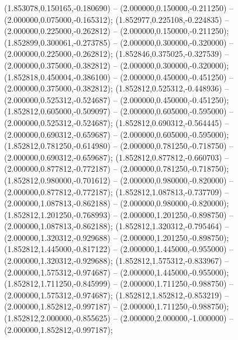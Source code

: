  (1.853078,0.150165,-0.180690) -- (2.000000,0.150000,-0.211250) -- (2.000000,0.075000,-0.165312);
 (1.852977,0.225108,-0.224835) -- (2.000000,0.225000,-0.262812) -- (2.000000,0.150000,-0.211250);
 (1.852899,0.300061,-0.273785) -- (2.000000,0.300000,-0.320000) -- (2.000000,0.225000,-0.262812);
 (1.852846,0.375025,-0.327539) -- (2.000000,0.375000,-0.382812) -- (2.000000,0.300000,-0.320000);
 (1.852818,0.450004,-0.386100) -- (2.000000,0.450000,-0.451250) -- (2.000000,0.375000,-0.382812);
 (1.852812,0.525312,-0.448936) -- (2.000000,0.525312,-0.524687) -- (2.000000,0.450000,-0.451250);
 (1.852812,0.605000,-0.509097) -- (2.000000,0.605000,-0.595000) -- (2.000000,0.525312,-0.524687);
 (1.852812,0.690312,-0.564445) -- (2.000000,0.690312,-0.659687) -- (2.000000,0.605000,-0.595000);
 (1.852812,0.781250,-0.614980) -- (2.000000,0.781250,-0.718750) -- (2.000000,0.690312,-0.659687);
 (1.852812,0.877812,-0.660703) -- (2.000000,0.877812,-0.772187) -- (2.000000,0.781250,-0.718750);
 (1.852812,0.980000,-0.701612) -- (2.000000,0.980000,-0.820000) -- (2.000000,0.877812,-0.772187);
 (1.852812,1.087813,-0.737709) -- (2.000000,1.087813,-0.862188) -- (2.000000,0.980000,-0.820000);
 (1.852812,1.201250,-0.768993) -- (2.000000,1.201250,-0.898750) -- (2.000000,1.087813,-0.862188);
 (1.852812,1.320312,-0.795464) -- (2.000000,1.320312,-0.929688) -- (2.000000,1.201250,-0.898750);
 (1.852812,1.445000,-0.817122) -- (2.000000,1.445000,-0.955000) -- (2.000000,1.320312,-0.929688);
 (1.852812,1.575312,-0.833967) -- (2.000000,1.575312,-0.974687) -- (2.000000,1.445000,-0.955000);
 (1.852812,1.711250,-0.845999) -- (2.000000,1.711250,-0.988750) -- (2.000000,1.575312,-0.974687);
 (1.852812,1.852812,-0.853219) -- (2.000000,1.852812,-0.997187) -- (2.000000,1.711250,-0.988750);
 (1.852812,2.000000,-0.855625) -- (2.000000,2.000000,-1.000000) -- (2.000000,1.852812,-0.997187);
